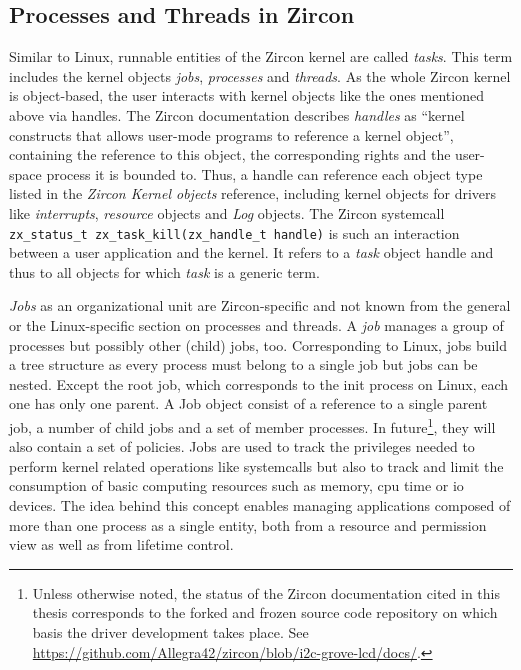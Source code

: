 \subsection{Processes and Threads in Zircon}\label{sec:processes-zircon}
Similar to Linux, runnable entities of the Zircon kernel are called \textit{tasks}.
This term includes the kernel objects \textit{jobs}, \textit{processes} and \textit{threads}.
As the whole Zircon kernel is object-based, the user interacts with kernel objects like the ones mentioned above via handles.
The Zircon documentation describes \textit{handles} as ``kernel constructs that allows user-mode programs to reference a kernel object''\cite{zircon-process}, containing the reference to this object, the corresponding rights and the user-space process it is bounded to.
Thus, a handle can reference each object type listed in the \textit{Zircon Kernel objects} reference\cite{zircon-objects}, including kernel objects for drivers like \textit{interrupts}, \textit{resource} objects and \textit{Log} objects.
The Zircon systemcall \texttt{zx\_status\_t zx\_task\_kill(zx\_handle\_t handle)} is such an interaction between a user application and the kernel. 
It refers to a \textit{task} object handle and thus to all objects for which \textit{task} is a generic term\cite{zircon-task}.

\textit{Jobs} as an organizational unit are Zircon-specific and not known from the general or the Linux-specific section on processes and threads.
A \textit{job} manages a group of processes but possibly other (child) jobs, too.
Corresponding to Linux, jobs build a tree structure as every process must belong to a single job but jobs can be nested.
Except the root job, which corresponds to the init process on Linux, each one has only one parent.
A Job object consist of a reference to a single parent job, a number of child jobs and a set of member processes.
In future\footnote{Unless otherwise noted, the status of the Zircon documentation cited in this thesis corresponds to the forked and frozen source code repository on which basis the driver development takes place. See \url{https://github.com/Allegra42/zircon/blob/i2c-grove-lcd/docs/}.}, they will also contain a set of policies\cite{zircon-job}.
Jobs are used to track the privileges needed to perform kernel related operations like systemcalls but also to track and limit the consumption of basic computing resources such as memory, \ac{cpu} time or \ac{io} devices\cite{zircon-job}.
The idea behind this concept enables managing applications composed of more than one process as a single entity, both from a resource and permission view as well as from lifetime control\cite{zircon-process}.

